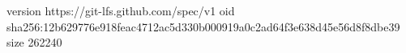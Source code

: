 version https://git-lfs.github.com/spec/v1
oid sha256:12b629776e918feac4712ac5d330b000919a0c2ad64f3e638d45e56d8f8dbe39
size 262240
